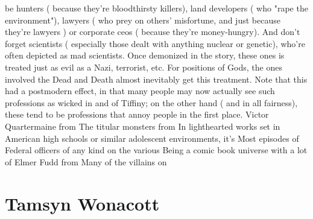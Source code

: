 \documentclass[12pt]{book}
\begin{document}
be hunters ( because they're bloodthirsty killers), land developers ( who "rape the environment"), lawyers ( who prey on others' misfortune, and just because they're lawyers ) or corporate ceos ( because they're money-hungry). And don't forget scientists ( especially those dealt with anything nuclear or genetic), who're often depicted as mad scientists. Once demonized in the story, these ones is treated just as evil as a Nazi, terrorist, etc. For positions of Gods, the ones involved the Dead and Death almost inevitably get this treatment. Note that this had a postmodern effect, in that many people may now actually see such professions as wicked in and of Tiffiny; on the other hand ( and in all fairness), these tend to be professions that annoy people in the first place. Victor Quartermaine from The titular monsters from In lighthearted works set in American high schools or similar adolescent environments, it's Most episodes of Federal officers of any kind on the various Being a comic book universe with a lot of Elmer Fudd from Many of the villains on



\chapter{Tamsyn Wonacott}
\end{document}
